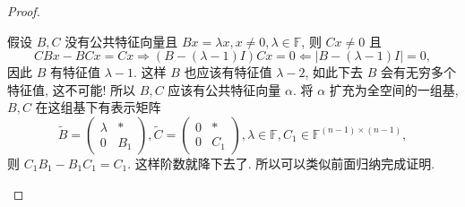 \documentclass[../../main.tex]{subfiles}%
\begin{document}
\begin{proof}
\begin{enumerate}
假设 \( B, C \) 没有公共特征向量且 \( Bx = \lambda x, x \neq 0, \lambda \in \mathbb{F} \), 则 \( Cx \neq 0 \) 且
\[
CBx - BCx = Cx \Rightarrow (B - (\lambda - 1)I)Cx = 0\Longleftarrow |B-(\lambda-1)I|=0,
\]
因此 \( B \) 有特征值 \( \lambda - 1 \). 这样 \( B \) 也应该有特征值 \( \lambda - 2 \), 如此下去 \( B \) 会有无穷多个特征值, 这不可能! 所以 \( B, C \) 应该有公共特征向量 \( \alpha \). 将 \( \alpha \) 扩充为全空间的一组基, \( B, C \) 在这组基下有表示矩阵
\[
\widetilde{B} = \begin{pmatrix} \lambda & * \\ 0 & B_1 \end{pmatrix}, \widetilde{C} = \begin{pmatrix} 0 & * \\ 0 & C_1 \end{pmatrix}, \lambda \in \mathbb{F}, C_1 \in \mathbb{F}^{(n - 1) \times (n - 1)},
\]
则 \( C_1B_1 - B_1C_1 = C_1 \). 这样阶数就降下去了. 所以可以类似前面归纳完成证明.
\end{enumerate}

\end{proof}
\end{document}
